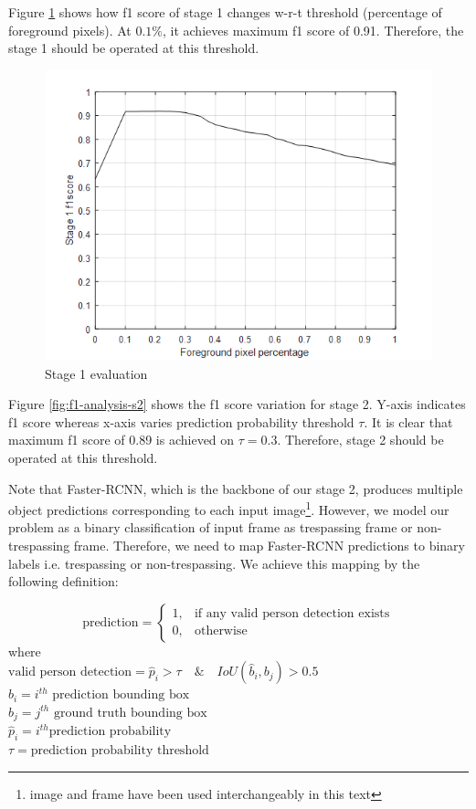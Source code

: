Figure \ref{fig:f1-analysis-mog} shows how f1 score of stage 1 changes w-r-t threshold (percentage of foreground pixels). At $0.1\%$, it achieves maximum f1 score of 0.91. Therefore, the stage 1 should be operated at this threshold.

\begin{figure}
    \centering
    \includegraphics[width=\linewidth]{images/f1-analysis-mog.png}
    \caption{Stage 1 evaluation}
    \label{fig:f1-analysis-mog}
\end{figure}

Figure \ref{fig:f1-analysis-s2} shows the f1 score variation for stage 2. Y-axis indicates f1 score whereas x-axis varies prediction probability threshold $\tau$. It is clear that maximum f1 score of 0.89 is achieved on $\tau=0.3$. Therefore, stage 2 should be operated at this threshold.

Note that Faster-RCNN, which is the backbone of our stage 2, produces multiple object predictions corresponding to each input image\footnote{image and frame have been used interchangeably in this text}. However, we model our problem as a binary classification of input frame as trespassing frame or non-trespassing frame. Therefore, we need to map Faster-RCNN predictions to binary labels i.e. trespassing or non-trespassing. We achieve this mapping by the following definition:

$$
\text{prediction} = 
\begin{cases}
1, &    \text{if any valid person detection exists} \\
0, &    \text{otherwise}
\end{cases}
$$
where \\
$\text{valid person detection} = \hat{p}_i>\tau \quad \& \quad IoU(\hat{b}_i,b_j)>0.5$ \\
$\hat{b}_i =i^{th} \text{ prediction bounding box}$ \\
$b_j =j^{th} \text{ ground truth bounding box}$ \\
$\hat{p}_i = i^{th} \text{prediction probability}$ \\
$\tau =  \text{prediction probability threshold}$

